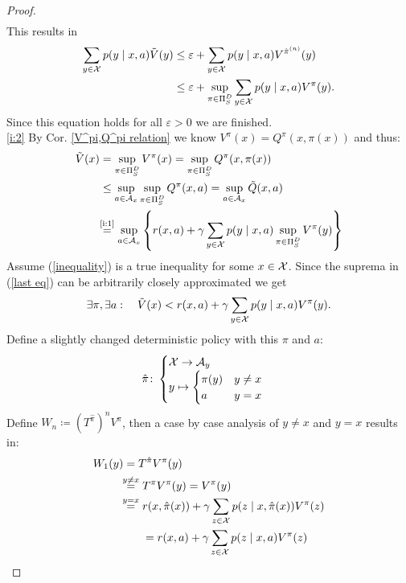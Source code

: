 \begin{proof}
\begin{align*}
	\end{align*}
	This results in
	\begin{align*}
		\sum_{y\in\mathcal{X}}p(y\mid x,a)\tilde{V}(y) 
		&\le \varepsilon + \sum_{y\in\mathcal{X}}p(y\mid x,a) V^{\hat{\pi}^{(n)}}(y) \\
		&\le \varepsilon + \sup_{\pi\in\Pi_S^D} \sum_{y\in\mathcal{X}}p(y\mid x,a) V^\pi(y).
	\end{align*}
	Since this equation holds for all \(\varepsilon>0\) we are finished.
	\\
	\ref{i:2}
	By Cor. \ref{V^pi,Q^pi relation} we know \(V^\pi(x)=Q^\pi(x,\pi(x))\) and thus:
	\begin{align}
		\tilde{V}(x)& =\sup_{\pi \in \detPolicy} V^\pi(x)
		=\sup_{\pi \in \detPolicy}Q^\pi(x,\pi(x)) 
		\nonumber\\
		&\le\sup_{a\in \cA_x} \sup_{\pi\in\detPolicy} Q^\pi(x,a)
		=\sup_{a\in \cA_x} \tilde{Q}(x,a)
		\label{inequality}
		\\
		&\lxeq{\text{\ref{i:1}}} \sup_{a\in \cA_x}\left\{ r(x,a)+\gamma\sum\limits_{y\in\cX}p(y\mid x,a) 
		\sup_{\pi\in\detPolicy} V^\pi(y) \right\} \label{last eq}
	\end{align}
	Assume (\ref{inequality}) is a true inequality for some \(x\in\mathcal{X}\). Since the suprema in (\ref{last eq}) can be arbitrarily closely approximated we get
	\[ 
		\exists \pi, \exists a :\quad \tilde{V}(x) < r(x,a) 
		+ \gamma\sum_{y\in\mathcal{X}} p(y\mid x,a) V^\pi(y).
	\]
	Define a slightly changed deterministic policy with this \(\pi\) and \(a\):
	\begin{align*}
		\hat{\pi}\colon
		\begin{cases}
			\mathcal{X}\to\mathcal{A}_y\\
			y\mapsto
			\begin{cases}
				\pi(y) & y\neq x\\
				a & y=x
			\end{cases}
		\end{cases}
	\end{align*}
	Define \(W_n\coloneqq (T^{\hat{\pi}})^n V^\pi\), then a case by case analysis of \(y\neq x\) and \(y=x\) results in:
	\begin{align*}
		W_1(y)&=T^{\hat{\pi}}V^\pi(y) \\
		&\lxeq{y\neq x} T^\pi V^\pi(y) = V^\pi(y)\\
		&\lxeq{y=x}  
		\begin{aligned}[t]
			&r(x, \hat{\pi}(x)) 
			+ \gamma \sum_{z\in\cX} p(z \mid x, \hat{\pi}(x)) V^\pi(z)  \\
			&=r(x, a) + \gamma \sum_{z\in\cX} p(z \mid x, a) V^\pi(z) \\

\end{aligned}
\end{align*}
\end{proof}
